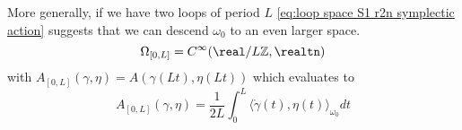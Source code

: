 \documentclass[../main-v2-manifolds.tex]{subfiles}
\begin{document}
%
%
%
\begin{remark}
    More generally, if we have two loops of period $L$ \cref{eq:loop space S1 r2n symplectic action} suggests that we can descend $\omega_0$ to an even larger space.
    \begin{equation}
        \Omega_{[0,L]} = C^\infty(\real/L\mathbb{Z}, \realtn)
        \label{eq:[0,L] r2n space}
    \end{equation}
    with $A_{[0,L]}(\gamma,\eta) = A(\gamma(Lt),\eta(Lt))$ which evaluates to
    \begin{equation}
     A_{[0,L]}(\gamma,\eta) = \frac{1}{2L}\int_{0}^{L}\langle \mathring{\gamma}(t),\eta(t)\rangle_{\omega_0}dt
     \label{eq:[0,L] r2n symplectic action}
    \end{equation}
\end{remark}
\end{document}
